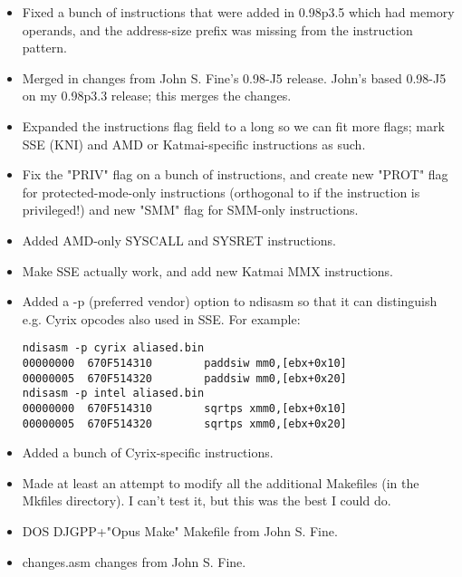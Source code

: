 \begin{itemize}
    \item{Fixed a bunch of instructions that were added in 0.98p3.5 which had
        memory operands, and the address-size prefix was missing from the
        instruction pattern.}
\end{itemize}


\begin{itemize}
    \item{Merged in changes from John S. Fine's 0.98-J5 release. John's based
        0.98-J5 on my 0.98p3.3 release; this merges the changes.}
    \item{Expanded the instructions flag field to a long so we can fit more
        flags; mark SSE (KNI) and AMD or Katmai-specific instructions as
        such.}
    \item{Fix the "PRIV" flag on a bunch of instructions, and create new
        "PROT" flag for protected-mode-only instructions (orthogonal to if
        the instruction is privileged!) and new "SMM" flag for SMM-only
        instructions.}
    \item{Added AMD-only SYSCALL and SYSRET instructions.}
    \item{Make SSE actually work, and add new Katmai MMX instructions.}
    \item{Added a -p (preferred vendor) option to ndisasm so that it can
        distinguish e.g. Cyrix opcodes also used in SSE. For example:
\begin{lstlisting}
ndisasm -p cyrix aliased.bin
00000000  670F514310        paddsiw mm0,[ebx+0x10]
00000005  670F514320        paddsiw mm0,[ebx+0x20]
ndisasm -p intel aliased.bin
00000000  670F514310        sqrtps xmm0,[ebx+0x10]
00000005  670F514320        sqrtps xmm0,[ebx+0x20]
\end{lstlisting}}
    \item{Added a bunch of Cyrix-specific instructions.}
\end{itemize}


\begin{itemize}
    \item{Made at least an attempt to modify all the additional Makefiles (in
        the Mkfiles directory). I can't test it, but this was the best I
        could do.}
    \item{DOS DJGPP+"Opus Make" Makefile from John S. Fine.}
    \item{changes.asm changes from John S. Fine.}
\end{itemize}

